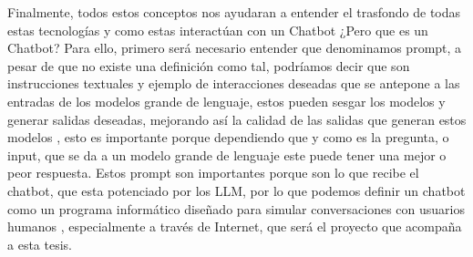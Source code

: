 Finalmente, todos estos conceptos nos ayudaran a entender el trasfondo de todas estas tecnologías y como estas interactúan 
con un Chatbot ¿Pero que es un Chatbot? Para ello, primero será necesario entender que denominamos prompt, a pesar de que 
no existe una definición como tal, podríamos decir que son instrucciones textuales y ejemplo de interacciones deseadas 
que se antepone a las entradas de los modelos grande de lenguaje, estos pueden sesgar los modelos y generar salidas 
deseadas, mejorando así la calidad de las salidas que generan estos modelos \cite{prompt}, esto es importante porque dependiendo 
que y como es la pregunta, o input, que se da a un modelo grande de lenguaje este puede tener una mejor o peor respuesta. 
Estos prompt son importantes porque son lo que recibe el chatbot, que esta potenciado por los LLM, por lo que podemos 
definir un chatbot como un programa informático diseñado para simular conversaciones con usuarios humanos \cite{chatbot_def}, especialmente 
a través de Internet, que será el proyecto que acompaña a esta tesis. 
